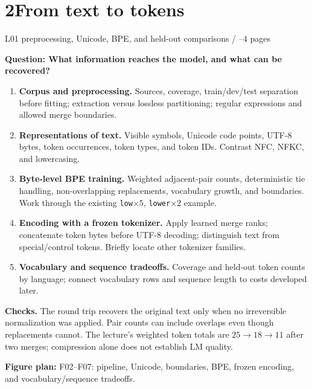 \documentclass[11pt,a4paper]{article}
\newcommand{\sectionplan}[3]{%
  \section{\texorpdfstring{#1\quad #2}{#1 #2}}
  {\small\color{muted}#3\par}}
\newcommand{\tagline}[1]{\textcolor{courseblue}{\textbf{#1}}}
\newcommand{\figids}[1]{\textcolor{courseteal}{\textbf{Figure plan:} #1}}
\begin{document}
\sectionplan{2}{From text to tokens}{L01 preprocessing, Unicode, BPE, and held-out comparisons \quad / \quad 3--4 pages}
\tagline{Question: What information reaches the model, and what can be recovered?}
\begin{enumerate}
  \item \textbf{Corpus and preprocessing.} Sources, coverage, train/dev/test
  separation before fitting; extraction versus lossless partitioning; regular
  expressions and allowed merge boundaries.
  \item \textbf{Representations of text.} Visible symbols, Unicode code
  points, UTF-8 bytes, token occurrences, token types, and token IDs.
  Contrast NFC, NFKC, and lowercasing.
  \item \textbf{Byte-level BPE training.} Weighted adjacent-pair counts,
  deterministic tie handling, non-overlapping replacements, vocabulary
  growth, and boundaries. Work through the existing
  \texttt{low}$\times5$, \texttt{lower}$\times2$ example.
  \item \textbf{Encoding with a frozen tokenizer.} Apply learned merge
  ranks; concatenate token bytes before UTF-8 decoding; distinguish text
  from special/control tokens. Briefly locate other tokenizer families.
  \item \textbf{Vocabulary and sequence tradeoffs.} Coverage and held-out
  token counts by language; connect vocabulary rows and sequence length
  to costs developed later.
\end{enumerate}
\textbf{Checks.} The round trip recovers the original text only when no
irreversible normalization was applied. Pair counts can include overlaps
even though replacements cannot. The lecture's weighted token totals are
$25\to18\to11$ after two merges; compression alone does not establish LM quality.

\figids{F02--F07: pipeline, Unicode, boundaries, BPE, frozen encoding,
and vocabulary/sequence tradeoffs.}
\end{document}
